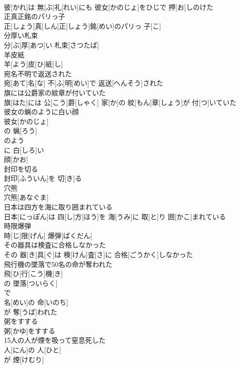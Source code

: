 \documentclass[8pt]{extreport}
\begin{document}
\begin{CJK}{UTF8}{min}
\\	彼[かれ]は 無[ぶ]礼[れい]にも 彼女[かのじょ]をひじで 押[お]しのけた
\\	正真正銘のパリっ子	
\\	正[しょう]真[しん]正[しょう]銘[めい]のパリっ 子[こ]
\\	分厚い札束	
\\	分[ぶ]厚[あつ]い 札束[さつたば]
\\	羊皮紙	
\\	羊[よう]皮[ひ]紙[し]
\\	宛名不明で返送された	
\\	宛[あて]名[な] 不[ふ]明[めい]で 返送[へんそう]された
\\	旗には公爵家の紋章が付いていた	
\\	旗[はた]には 公[こう]爵[しゃく] 家[か]の 紋[もん]章[しょう]が 付[つ]いていた
\\	彼女の蝋のように白い顔	
\\	彼女[かのじょ]
\\	の 蝋[ろう]
\\	のよう 
\\	に 白[しろ]い 
\\	顔[かお]
\\	封印を切る	
\\	封印[ふういん]を 切[き]る
\\	穴熊	
\\	穴熊[あなぐま]
\\	日本は四方を海に取り囲まれている	
\\	日本[にっぽん]は 四[し]方[ほう]を 海[うみ]に 取[と]り 囲[かこ]まれている
\\	時限爆弾	
\\	時[じ]限[げん] 爆弾[ばくだん]
\\	その器具は検査に合格しなかった	
\\	その 器[き]具[ぐ]は 検[けん]査[さ]に 合格[ごうかく]しなかった
\\	飛行機の墜落で50名の命が奪われた	
\\	飛[ひ]行[こう]機[き]
\\	の 墜落[ついらく]
\\	で 
\\	名[めい]の 命[いのち]
\\	が 奪[うば]われた 
\\	粥をすする	
\\	粥[かゆ]をすする
\\	15人の人が煙を吸って窒息死した	
\\	人[にん]の 人[ひと]
\\	が 煙[けむり]

\end{CJK}
\end{document}
